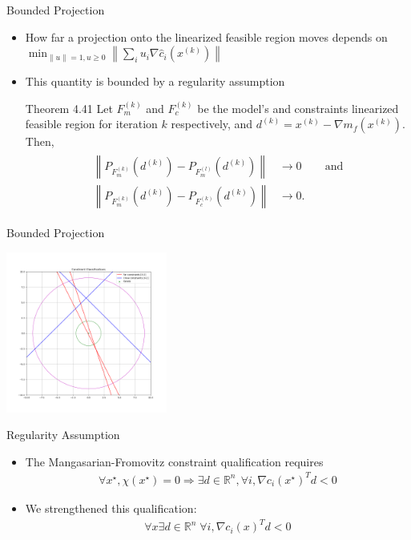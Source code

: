 \documentclass{beamer}
\newcommand{\Rn}{\mathbb R ^ {n}}
\newcommand{\xk}{{{x}^{(k)}}}
\newcommand{\neggrad}{d^{(k)}}
\begin{document}
\begin{frame}{Bounded Projection}
	\begin{itemize}
		\item How far a projection onto the linearized feasible region moves depends on
		$
			\min_{\|u\| = 1, u \ge 0} \left\|\sum_{i} u_i \nabla \hat c_i\left(\xk\right)\right\|
		$
		\item This quantity is bounded by a regularity assumption
		\begin{block}{Theorem 4.41}
			Let $F_m^{(k)}$ and $F_c^{(k)}$ be the model's and constraints linearized feasible region for iteration $k$ respectively,
			and $\neggrad = \xk - \nabla m_f\left(\xk\right)$. Then,
			\begin{align*}
				\begin{array}{ccc}
					\left\|P_{F_m^{(k)}}\left(\neggrad\right)
					-  P_{F_m^{(l)}}\left(\neggrad\right)\right\| & \to 0 & \quad \textrm{and} \\
					\left\|P_{F_m^{(k)}}\left(\neggrad\right)
					-  P_{F_c^{(k)}}\left(\neggrad\right)\right\| & \to 0. &
				\end{array}
			\end{align*}
		\end{block}
	\end{itemize}
\end{frame}



\begin{frame}{Bounded Projection}
	\begin{center}
		\includegraphics[width=200px]{images/classification.png}
	\end{center}
\end{frame}


\begin{frame}{Regularity Assumption}
\begin{itemize}
\item The Mangasarian-Fromovitz constraint qualification requires
\begin{align*}
\forall x^{\star}, \chi\left(x^{\star}\right) = 0 
\Longrightarrow \exists d \in \Rn, \forall i, \nabla c_i\left(x^{\star}\right)^T d < 0 
\end{align*}
\item We strengthened this qualification:
\begin{align*}
\forall x \exists d \in \Rn\; \forall i, \nabla c_i\left(x\right)^T d < 0
\end{align*}
\end{itemize}
\end{frame}
\end{document}
